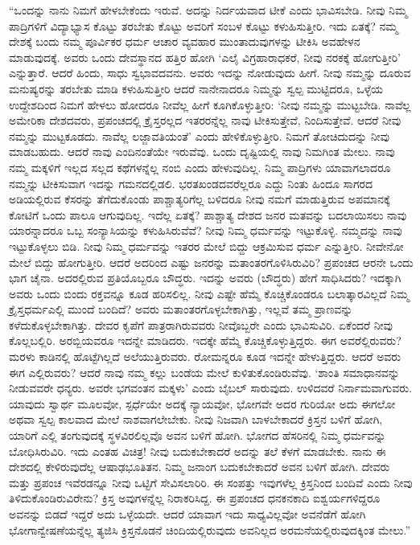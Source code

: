  “ಒಂದನ್ನು ನಾನು ನಿಮಗೆ ಹೇಳಬೇಕೆಂದು ಇರುವೆ. ಅದನ್ನು ನಿರ್ದಯವಾದ ಟೀಕೆ ಎಂದು ಭಾವಿಸಬೇಡಿ. ನೀವು ನಿಮ್ಮ ಪಾದ್ರಿಗಳಿಗೆ ವಿದ್ಯಾಭ್ಯಾಸ ಕೊಟ್ಟು ತರಬೇತು ಕೊಟ್ಟು ಅವರಿಗೆ ಸಂಬಳ ಕೊಟ್ಟು ಕಳುಹಿಸುತ್ತೀರಿ. ಇದು ಏತಕ್ಕೆ? ನಮ್ಮ ದೇಶಕ್ಕೆ ಬಂದು ನಮ್ಮ ಪೂರ್ವಿಕರ ಧರ್ಮ ಆಚಾರ ವ್ಯವಹಾರ ಮುಂತಾದುವುಗಳನ್ನು ಟೀಕಿಸಿ ಅವಹೇಳನ ಮಾಡುವುದಕ್ಕೆ. ಅವರು ಒಂದು ದೇವಸ್ಥಾನದ ಹತ್ತಿರ ಹೋಗಿ ‘ಎಲೈ ವಿಗ್ರಹಾರಾಧಕರೆ, ನೀವು ನರಕಕ್ಕೆ ಹೋಗುತ್ತೀರಿ’ ಎನ್ನುತ್ತಾರೆ. ಆದರೆ ಹಿಂದು, ಸಾಧು ಸ್ವಭಾವದವನು. ಅವರು ಇದನ್ನು ನೋಡುವುದು ಹೀಗೆ. ನೀವು ನಮ್ಮನ್ನು ದೂರುವ ಮನುಷ್ಯರನ್ನು ತರಬೇತು ಮಾಡಿ ಕಳುಹಿಸುತ್ತೀರಿ ಆದರೆ ನಾನೇನಾದರೂ ನಿಮ್ಮನ್ನು ಸ್ವಲ್ಪ ಮುಟ್ಟಿದರೂ, ಒಳ್ಳೆಯ ಉದ್ದೇಶದಿಂದ ನಿಮಗೆ ಹೇಳಲು ಹೋದರೂ ನೀವೆಲ್ಲ ಹೀಗೆ ಕೂಗಿಕೊಳ್ಳುತ್ತೀರಿ: ‘ನೀವು ನಮ್ಮನ್ನು ಮುಟ್ಟಬೇಡಿ. ನಾವೆಲ್ಲ ಅಮೇರಿಕಾ ದೇಶದವರು, ಪ್ರಪಂಚದಲ್ಲಿ ಕ್ರೈಸ್ತರಲ್ಲದ ಇತರರನ್ನೆಲ್ಲ ನಾವು ಟೀಕಿಸುತ್ತೇವೆ, ನಿಂದಿಸುತ್ತೇವೆ. ಆದರೆ ನೀವು ನಮ್ಮನ್ನು ಮುಟ್ಟಕೂಡದು. ನಾವೆಲ್ಲ ಲಜ್ಜಾವತಿಯಂತೆ’ ಎಂದು ಹೇಳಿಕೊಳ್ಳುತ್ತೀರಿ. ನಿಮಗೆ ತೋಚಿದುದನ್ನು ನೀವು ಮಾಡಬಹುದು. ಆದರೆ ನಾವು ಎಂದಿನಂತೆಯೇ ಇರುವೆವು. ಒಂದು ದೃಷ್ಟಿಯಲ್ಲಿ ನಾವು ನಿಮಗಿಂತ ಮೇಲು. ನಾವು ನಮ್ಮ ಮಕ್ಕಳಿಗೆ ಇಲ್ಲದ ಸಲ್ಲದ ಕಥೆಗಳನ್ನೆಲ್ಲ ನಂಬಿ ಎಂದು ಹೇಳುವುದಿಲ್ಲ. ನಿಮ್ಮ ಪಾದ್ರಿಗಳು ಯಾವಾಗಲಾದರೂ ನಮ್ಮನ್ನು ಟೀಕಿಸುವಾಗ ಇದನ್ನು ಗಮನದಲ್ಲಿಡಲಿ. ಭರತಖಂಡದವರೆಲ್ಲರೂ ಎದ್ದು ನಿಂತು ಹಿಂದೂ ಸಾಗರದ ಅಡಿಯಲ್ಲಿರುವ ಕೆಸರನ್ನು ತೆಗೆದುಕೊಂಡು ಪಾಶ್ಚಾತ್ಯರಿಗೆಲ್ಲ ಬಳಿದರೂ ನೀವು ನಮಗೆ ಮಾಡುತ್ತಿರುವ ಅಪಮಾನಕ್ಕೆ ಕೋಟಿಗೆ ಒಂದು ಪಾಲೂ ಆಗುವುದಿಲ್ಲ. ಇದೆಲ್ಲ ಏತಕ್ಕೆ? ಪಾಶ್ಚಾತ್ಯ ದೇಶದ ಜನರ ಮತವನ್ನು ಬದಲಾಯಿಸಲು ನಾವು ಯಾರನ್ನಾದರೂ ಒಬ್ಬ ಸಂನ್ಯಾಸಿಯನ್ನು ಕಳುಹಿಸಿರುವೆವೆ? ನೀವು ನಿಮ್ಮ ಧರ್ಮವನ್ನು ಇಟ್ಟುಕೊಳ್ಳಿ. ನಮ್ಮದನ್ನು ನಾವು ಇಟ್ಟುಕೊಳ್ಳಲು ಬಿಡಿ. ನೀವು ನಿಮ್ಮ ಧರ್ಮವನ್ನು ಇತರರ ಮೇಲೆ ಬಿದ್ದು ಆಕ್ರಮಿಸುವ ಧರ್ಮ ಎನ್ನುತ್ತೀರಿ. ನೀವೇನೋ ಮೇಲೆ ಬಿದ್ದು ಹೋಗುತ್ತೀರಿ. ಆದರೆ ಅದರಿಂದ ಎಷ್ಟು ಜನರನ್ನು ಮತಾಂತರಗೊಳಿಸಿರುವಿರಿ? ಪ್ರಪಂಚದ ಆರನೇ ಒಂದು ಭಾಗ ಚೈನಾ. ಅದರಲ್ಲಿರುವ ಪ್ರತಿಯೊಬ್ಬರೂ ಬೌದ್ಧರು. ಇದನ್ನು ಅವರು (ಬೌದ್ಧರು) ಹೇಗೆ ಸಾಧಿಸಿದರು? ಇದಕ್ಕಾಗಿ ಅವರು ಒಂದು ಬಿಂದು ರಕ್ತವನ್ನೂ ಕೂಡ ಹರಿಸಲಿಲ್ಲ. ನೀವು ಎಷ್ಟೇ ಹೆಮ್ಮೆ ಕೊಚ್ಚಿಕೊಂಡರೂ ಬಲಾತ್ಕಾರವಿಲ್ಲದೆ ನಿಮ್ಮ ಕ್ರೈಸ್ತಧರ್ಮಎಲ್ಲಿ ಮುಂದೆ ಬಂದಿದೆ? ಅವರು ಮತಾಂತರಗೊಳ್ಳಬೇಕಾಗಿತ್ತು, ಇಲ್ಲವೆ ತಮ್ಮ ಪ್ರಾಣವನ್ನು ಕಳೆದುಕೊಳ್ಳಬೇಕಾಗಿತ್ತು. ದೇವರ ಕೃಪೆಗೆ ಪಾತ್ರರಾಗಿರುವವರು ನೀವೊಬ್ಬರೇ ಎಂದು ಭಾವಿಸುವಿರಿ. ಏಕೆಂದರೆ ನೀವು ಕೊಲ್ಲಬಲ್ಲಿರಿ. ಅರಬ್ಬಿಯವರೂ ಇದನ್ನೇ ಮಾಡಿದರು. ಇದಕ್ಕೇ ಹೆಮ್ಮೆ ಕೊಚ್ಚಿಕೊಳ್ಳುತ್ತಿದ್ದರು. ಈಗ ಅವರೆಲ್ಲಿರುವರು? ಮರಳು ಕಾಡಿನಲ್ಲಿ ಹೊಟ್ಟೆಗಿಲ್ಲದೆ ಅಲೆಯುತ್ತಿರುವರು. ರೋಮನ್ನರೂ ಕೂಡ ಇದನ್ನೇ ಹೇಳುತ್ತಿದ್ದರು. ಆದರೆ ಅವರು ಈಗ ಎಲ್ಲಿರುವರು? ಆದರೆ ನಾವು ನಮ್ಮ ಕಲ್ಲು ಬಂಡೆಯ ಮೇಲೆ ಕುಳಿತುಕೊಂಡಿರುವೆವು. ‘ಶಾಂತಿ ಸಮಾಧಾನವನ್ನು ನೀಡುವವರೇ ಧನ್ಯರು. ಅವರೇ ಭಗವಂತನ ಮಕ್ಕಳು’ ಎಂದು ಬೈಬಲ್ ಸಾರುವುದು. ಉಳಿದವರೆ ನಿರ್ನಾಮವಾಗುವರು. ಯಾವುದು ಸ್ವಾರ್ಥ ಮೂಲವೋ, ಸ್ಪರ್ಧೆಯೇ ಅದಕ್ಕೆ ನ್ಯಾಯವೋ, ಭೋಗವೇ ಅದರ ಗುರಿಯೋ ಅದು ಈಗಲೋ ಅಥವಾ ಸ್ವಲ್ಪ ಕಾಲವಾದ ಮೇಲೆ ನಾಶವಾಗಲೇಬೇಕು. ನೀವು ನಿಜವಾಗಿ ಬಾಳಬೇಕಾದರೆ ಕ್ರಿಸ್ತನ ಬಳಿಗೆ ಹೋಗಿ, ಯಾರಿಗೆ ಎಲ್ಲಿ ತಂಗುವುದಕ್ಕೆ ಸ್ಥಳವಿರಲಿಲ್ಲವೊ ಅವನ ಬಳಿಗೆ ಹೋಗಿ. ಭೋಗದ ಹೆಸರಿನಲ್ಲಿ ನಿಮ್ಮ ಧರ್ಮವನ್ನು ಬೋಧಿಸಿರುವಿರಿ. ಇದು ಎಂತಹ ವಿಚಿತ್ರ! ನೀವು ಬದುಕಬೇಕಾದರೆ ಅದನ್ನು ತಲೆ ಕೆಳಗೆ ಮಾಡಬೇಕು. ನಾನು ಈ ದೇಶದಲ್ಲಿ ಕೇಳಿರುವುದೆಲ್ಲ ಆಷಾಢಭೂತಿತನ. ನಿಮ್ಮ ಜನಾಂಗ ಬದುಕಬೇಕಾದರೆ ಅವನ ಬಳಿಗೆ ಹೋಗಿ. ದೇವರು ಮತ್ತು ಪ್ರಪಂಚ ಇವೆರಡನ್ನೂ ನೀವು ಒಟ್ಟಿಗೆ ಸೇವಿಸಲಾರಿರಿ. ಈ ಸಂಪತ್ತು ಇವುಗಳೆಲ್ಲ ಕ್ರಿಸ್ತನಿಂದ ಬಂದಿವೆ ಎಂದು ನೀವು ತಿಳಿದುಕೊಂಡಿರುವಿರೇನು? ಕ್ರಿಸ್ತ ಅವುಗಳನ್ನೆಲ್ಲ ನಿರಾಕರಿಸಿದ್ದ. ಈ ಪ್ರಪಂಚದ ಧನಕನಕಾದಿ ಐಶ್ವರ್ಯಗಳಿದ್ದರೂ ಅವನನ್ನು ಬಿಡದೆ ಇದ್ದರೆ ಅದು ಒಳ್ಳೆಯದೇ. ಆದರೆ ಯಾವಾಗ ಇದು ಸಾಧ್ಯವಿಲ್ಲವೋ ಅವನೆಡೆಗೆ ಹೋಗಿ ಭೋಗಾನ್ವೇಷಣೆಯನ್ನೆಲ್ಲ ತ್ಯಜಿಸಿ ಕ್ರಿಸ್ತನೊಡನೆ ಚಿಂದಿಯಲ್ಲಿರುವುದು ಅವನಿಲ್ಲದ ಅರಮನೆಯಲ್ಲಿರುವುದಕ್ಕಿಂತ ಮೇಲು.” 

